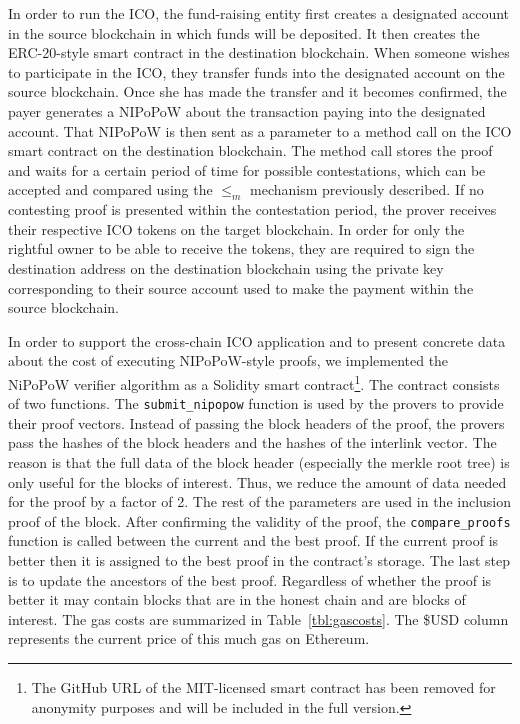 In order to run the ICO, the fund-raising entity first creates a designated
account in the source blockchain in which funds will be deposited. It then
creates the ERC-20-style smart contract in the destination blockchain. When
someone wishes to participate in the ICO, they transfer funds into the
designated account on the source blockchain. Once she has made the transfer and
it becomes confirmed, the payer generates a NIPoPoW about the transaction paying
into the designated account. That NIPoPoW is then sent as a parameter to a
method call on the ICO smart contract on the destination blockchain. The method
call stores the proof and waits for a certain period of time for possible
contestations, which can be accepted and compared using the $\leq_m$ mechanism
previously described. If no contesting proof is presented within the
contestation period, the prover receives their respective ICO tokens on the
target blockchain. In order for only the rightful owner to be able to receive
the tokens, they are required to sign the destination address on the destination
blockchain using the private key corresponding to their source account used to
make the payment within the source blockchain.

In order to support the cross-chain ICO application and to present concrete data
about the cost of executing NIPoPoW-style proofs, we implemented the NiPoPoW
verifier algorithm as a Solidity smart contract\footnote{The GitHub URL of the
MIT-licensed smart contract has been removed for anonymity purposes and will
be included in the full version.}. The contract consists of two functions.
The \texttt{submit\_nipopow} function is used by the provers to provide their
proof vectors. Instead of passing the block headers of the proof, the provers
pass the hashes of the block headers and the hashes of the interlink vector. The
reason is that the full data of the block header (especially the merkle root
tree) is only useful for the blocks of interest. Thus, we reduce the amount of
data needed for the proof by a factor of 2. The rest of the parameters are used
in the inclusion proof of the block. After confirming the validity of the proof,
the \texttt{compare\_proofs} function is called between the current and the best
proof. If the current proof is better then it is assigned to the best proof in
the contract's storage. The last step is to update the ancestors of the best
proof. Regardless of whether the proof is better it may contain blocks that are
in the honest chain and are blocks of interest. The gas costs are summarized in
Table~\ref{tbl:gascosts}. The \$USD column represents the current price of this
much gas on Ethereum.

